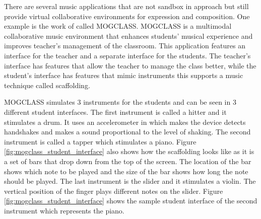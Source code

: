
There are several music applications that are not sandbox in approach but still provide virtual collaborative environments for expression and composition. One example is the work of \cite{zhou2011mogclass} called MOGCLASS. MOGCLASS is a multimodal collaborative music environment that enhances students’ musical experience and improves teacher’s management of the classroom. This application features an interface for the teacher and a separate interface for the students. The teacher’s interface has features that allow the teacher to manage the class better, while the student’s interface has features that mimic instruments this supports a music technique called scaffolding.

MOGCLASS simulates 3 instruments for the students and can be seen in 3 different student interfaces. The first instrument is called a hitter and it stimulates a drum. It uses an accelerometer in which makes the device detects handshakes and makes a sound proportional to the level of shaking. The second instrument is called a tapper which stimulates a piano. Figure \ref{fig:mogclass_student_interface} also shows how the scaffolding looks like as it is a set of bars that drop down from the top of the screen. The location of the bar shows which note to be played and the size of the bar shows how long the note should be played. The last instrument is the slider and it stimulates a violin. The vertical position of the finger plays different notes on the slider. Figure \ref{fig:mogclass_student_interface} shows the sample student interface of the second instrument which represents the piano.

